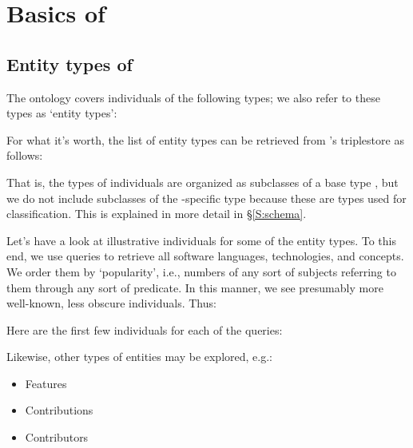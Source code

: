 
\section{Basics of \solasote}

\subsection{Entity types of \solasote}

The ontology covers individuals of the following types; we also refer
to these types as `entity types':


\noindent
For what it's worth, the list of entity types can be retrieved from
\solasote's triplestore as follows:


\noindent
That is, the types of individuals are organized as subclasses of a
base type , but we do not include subclasses of the
\solasote-specific type  because these are types
used for classification. This is explained in more detail in
\S\ref{S:schema}.

Let's have a look at illustrative individuals for some of the entity types. To this end, we use queries to retrieve all software languages, technologies, and concepts. We order them by `popularity', i.e., numbers of any sort of subjects referring to them through any sort of predicate. In this manner, we see presumably more well-known, less obscure individuals. Thus:




\noindent
Here are the first few individuals for each of the queries:






Likewise, other types of entities may be explored, e.g.:

\begin{itemize}
\item Features
\item Contributions
\item Contributors
\end{itemize}

